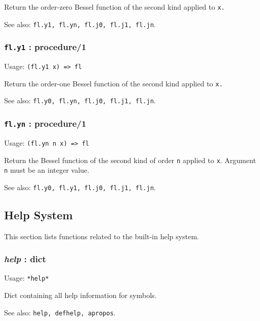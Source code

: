 \documentclass[
]{article}
\newcommand{\passthrough}[1]{#1}
\begin{document}
Return the order-zero Bessel function of the second kind applied to
\passthrough{\lstinline!x.!}

See also: \passthrough{\lstinline!fl.y1, fl.yn, fl.j0, fl.j1, fl.jn!}.

\hypertarget{fl.y1-procedure1}{%
\subsubsection{\texorpdfstring{\texttt{fl.y1} :
procedure/1}{fl.y1 : procedure/1}}\label{fl.y1-procedure1}}

Usage: \passthrough{\lstinline!(fl.y1 x) => fl!}

Return the order-one Bessel function of the second kind applied to
\passthrough{\lstinline!x.!}

See also: \passthrough{\lstinline!fl.y0, fl.yn, fl.j0, fl.j1, fl.jn!}.

\hypertarget{fl.yn-procedure1}{%
\subsubsection{\texorpdfstring{\texttt{fl.yn} :
procedure/1}{fl.yn : procedure/1}}\label{fl.yn-procedure1}}

Usage: \passthrough{\lstinline!(fl.yn n x) => fl!}

Return the Bessel function of the second kind of order
\passthrough{\lstinline!n!} applied to \passthrough{\lstinline!x!}.
Argument \passthrough{\lstinline!n!} must be an integer value.

See also: \passthrough{\lstinline!fl.y0, fl.y1, fl.j0, fl.j1, fl.jn!}.

\hypertarget{help-system}{%
\subsection{Help System}\label{help-system}}

This section lists functions related to the built-in help system.

\hypertarget{help-dict}{%
\subsubsection{\texorpdfstring{\emph{help} :
dict}{help : dict}}\label{help-dict}}

Usage: \passthrough{\lstinline!*help*!}

Dict containing all help information for symbols.

See also: \passthrough{\lstinline!help, defhelp, apropos!}.
\end{document}
